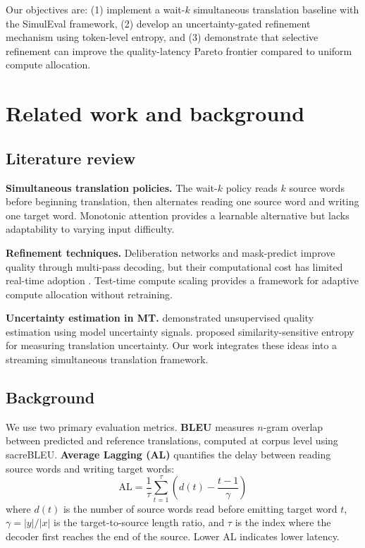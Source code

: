 Our objectives are: (1) implement a wait-$k$ simultaneous translation baseline with the SimulEval framework, (2) develop an uncertainty-gated refinement mechanism using token-level entropy, and (3) demonstrate that selective refinement can improve the quality-latency Pareto frontier compared to uniform compute allocation.

\section{Related work and background}

\subsection{Literature review}

\textbf{Simultaneous translation policies.} The wait-$k$ policy \citep{ma2019stacl} reads $k$ source words before beginning translation, then alternates reading one source word and writing one target word. Monotonic attention \citep{ma2020mma} provides a learnable alternative but lacks adaptability to varying input difficulty.

\textbf{Refinement techniques.} Deliberation networks \citep{xia2017deliberation} and mask-predict \citep{ghazvininejad2019maskpredict} improve quality through multi-pass decoding, but their computational cost has limited real-time adoption \citep{dou2024iterative}. Test-time compute scaling \citep{snell2024scaling, wang2023selfconsistency} provides a framework for adaptive compute allocation without retraining.

\textbf{Uncertainty estimation in MT.} \citet{fomicheva2020unsupervised} demonstrated unsupervised quality estimation using model uncertainty signals. \citet{cheng2024entropy} proposed similarity-sensitive entropy for measuring translation uncertainty. Our work integrates these ideas into a streaming simultaneous translation framework.

\subsection{Background}

We use two primary evaluation metrics. \textbf{BLEU} \citep{rei2020comet} measures $n$-gram overlap between predicted and reference translations, computed at corpus level using sacreBLEU. \textbf{Average Lagging (AL)} \citep{ma2019stacl} quantifies the delay between reading source words and writing target words:
\begin{equation}
\text{AL} = \frac{1}{\tau} \sum_{t=1}^{\tau} \left( d(t) - \frac{t-1}{\gamma} \right)
\end{equation}
where $d(t)$ is the number of source words read before emitting target word $t$, $\gamma = |y|/|x|$ is the target-to-source length ratio, and $\tau$ is the index where the decoder first reaches the end of the source. Lower AL indicates lower latency.

